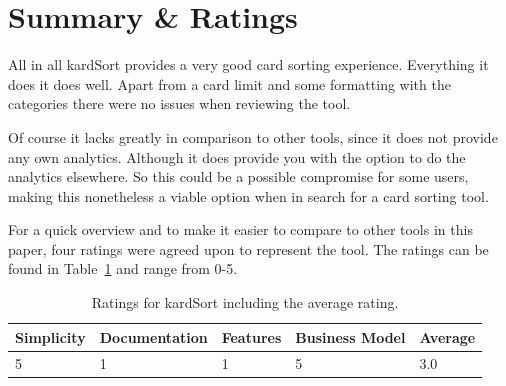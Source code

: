 \section{Summary \& Ratings}
All in all kardSort provides a very good card sorting experience. 
Everything it does it does well. Apart from a card limit and some 
formatting with the categories there were no issues when reviewing 
the tool.

Of course it lacks greatly in comparison to other tools, since it 
does not provide any own analytics. Although it does provide you
with the option to do the analytics elsewhere. So this could be a
possible compromise for some users, making this nonetheless a viable
option when in search for a card sorting tool.

For a quick overview and to make it easier to compare to other tools
in this paper, four ratings were agreed upon to represent the tool. The ratings can be
found in Table~\ref{tab:rating-kardSort} and range from 0-5.

\begin{table}[tp] 
\centering 
\begin{tabularx}{\linewidth}{|X|X|X|X|X|}
\hline
Simplicity & Documentation & Features & Business Model & Average \\ 
\hline 
5 & 1 & 1 & 5 & 3.0 \\ 
\hline 
\end{tabularx} 
\caption[Ratings for kardSort] {
Ratings for kardSort including the average rating.
} 
\label{tab:rating-kardSort}
\end{table}